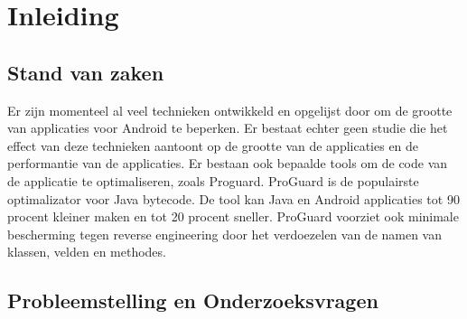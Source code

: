 
\chapter{Inleiding}
\label{ch:inleiding}


\section{Stand van zaken}
\label{sec:stand-van-zaken}


Er zijn momenteel al veel technieken ontwikkeld en opgelijst door \textcite{google} om de grootte van applicaties voor Android te beperken. Er bestaat echter geen studie die het effect van deze technieken aantoont op de grootte van de applicaties en de performantie van de applicaties. Er bestaan ook bepaalde tools om de code van de applicatie te optimaliseren, zoals Proguard. ProGuard is de populairste optimalizator voor Java bytecode. De tool kan Java en Android applicaties tot 90 procent kleiner maken en tot 20 procent sneller. ProGuard voorziet ook minimale bescherming tegen reverse engineering door het  verdoezelen van de namen van klassen, velden en methodes.

\section{Probleemstelling en Onderzoeksvragen}
\label{sec:onderzoeksvragen}

